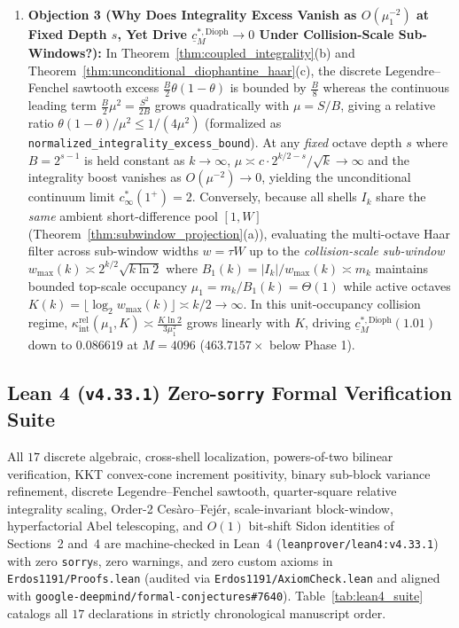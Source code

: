 \documentclass[11pt,reqno]{amsart}
\theoremstyle{definition}
\theoremstyle{remark}
\begin{document}
\begin{enumerate}
  \item \textbf{Objection 3 (Why Does Integrality Excess Vanish as $O(\mu_1^{-2})$ at Fixed Depth $s$, Yet Drive $\underline{c}_M^{*,\mathrm{Dioph}} \to 0$ Under Collision-Scale Sub-Windows?):} In Theorem~\ref{thm:coupled_integrality}(b) and Theorem~\ref{thm:unconditional_diophantine_haar}(c), the discrete Legendre--Fenchel sawtooth excess $\frac{B}{2}\theta(1-\theta)$ is bounded by $\frac{B}{8}$ whereas the continuous leading term $\frac{B}{2}\mu^2 = \frac{S^2}{2B}$ grows quadratically with $\mu = S/B$, giving a relative ratio $\theta(1-\theta)/\mu^2 \le 1/(4\mu^2)$ (formalized as \texttt{normalized\_integrality\_excess\_bound}). At any \emph{fixed} octave depth $s$ where $B = 2^{s-1}$ is held constant as $k \to \infty$, $\mu \asymp c \cdot 2^{k/2 - s}/\sqrt{k} \to \infty$ and the integrality boost vanishes as $O(\mu^{-2}) \to 0$, yielding the unconditional continuum limit $c_\infty^*(1^+) = 2$. Conversely, because all shells $I_k$ share the \emph{same} ambient short-difference pool $[1, W]$ (Theorem~\ref{thm:subwindow_projection}(a)), evaluating the multi-octave Haar filter across sub-window widths $w = \tau W$ up to the \emph{collision-scale sub-window} $w_{\max}(k) \asymp 2^{k/2}\sqrt{k \ln 2}$ where $B_1(k) = |I_k|/w_{\max}(k) \asymp m_k$ maintains bounded top-scale occupancy $\mu_1 = m_k / B_1(k) = \Theta(1)$ while active octaves $K(k) = \lfloor \log_2 w_{\max}(k)\rfloor \asymp k/2 \to \infty$. In this unit-occupancy collision regime, $\kappa_{\mathrm{int}}^{\mathrm{rel}}(\mu_1, K) \asymp \frac{K \ln 2}{3\mu_1^2}$ grows linearly with $K$, driving $\underline{c}_M^{*,\mathrm{Dioph}}(1.01)$ down to $\mathbf{0.086619}$ at $M = 4096$ ($463.7157\times$ below Phase 1).
\end{enumerate}

\subsection{Lean 4 (\texttt{v4.33.1}) Zero-\texttt{sorry} Formal Verification Suite}

All $17$ discrete algebraic, cross-shell localization, powers-of-two bilinear verification, KKT convex-cone increment positivity, binary sub-block variance refinement, discrete Legendre--Fenchel sawtooth, quarter-square relative integrality scaling, Order-2 Ces\`aro--Fej\'er, scale-invariant block-window, hyperfactorial Abel telescoping, and $O(1)$ bit-shift Sidon identities of Sections~2 and~4 are machine-checked in Lean~4 (\texttt{leanprover/lean4:v4.33.1}) with zero \texttt{sorry}s, zero warnings, and zero custom axioms in \texttt{Erdos1191/Proofs.lean} (audited via \texttt{Erdos1191/AxiomCheck.lean} and aligned with \texttt{google-deepmind/formal-conjectures\#7640}). Table~\ref{tab:lean4_suite} catalogs all $17$ declarations in strictly chronological manuscript order.
\end{document}
